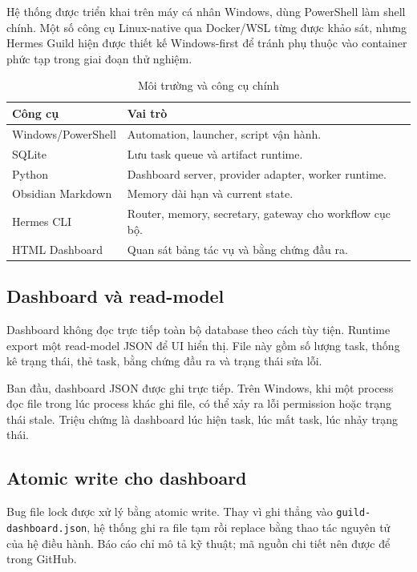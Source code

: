 \documentclass[12pt,a4paper]{article}
\begin{document}
Hệ thống được triển khai trên máy cá nhân Windows, dùng PowerShell làm shell chính. Một số công cụ Linux-native qua Docker/WSL từng được khảo sát, nhưng Hermes Guild hiện được thiết kế Windows-first để tránh phụ thuộc vào container phức tạp trong giai đoạn thử nghiệm.

\begin{table}[H]
\centering
\caption{Môi trường và công cụ chính}
\begin{tabular}{p{}p{}}
\toprule
\textbf{Công cụ} & \textbf{Vai trò} \\
\midrule
Windows/PowerShell & Automation, launcher, script vận hành. \\
SQLite & Lưu task queue và artifact runtime. \\
Python & Dashboard server, provider adapter, worker runtime. \\
Obsidian Markdown & Memory dài hạn và current state. \\
Hermes CLI & Router, memory, secretary, gateway cho workflow cục bộ. \\
HTML Dashboard & Quan sát bảng tác vụ và bằng chứng đầu ra. \\
\bottomrule
\end{tabular}
\end{table}

\subsection{Dashboard và read-model}

Dashboard không đọc trực tiếp toàn bộ database theo cách tùy tiện. Runtime export một read-model JSON để UI hiển thị. File này gồm số lượng task, thống kê trạng thái, thẻ task, bằng chứng đầu ra và trạng thái sửa lỗi.

Ban đầu, dashboard JSON được ghi trực tiếp. Trên Windows, khi một process đọc file trong lúc process khác ghi file, có thể xảy ra lỗi permission hoặc trạng thái stale. Triệu chứng là dashboard lúc hiện task, lúc mất task, lúc nhảy trạng thái.

\subsection{Atomic write cho dashboard}

Bug file lock được xử lý bằng atomic write. Thay vì ghi thẳng vào \texttt{guild-dashboard.json}, hệ thống ghi ra file tạm rồi replace bằng thao tác nguyên tử của hệ điều hành. Báo cáo chỉ mô tả kỹ thuật; mã nguồn chi tiết nên được để trong GitHub.
\end{document}

